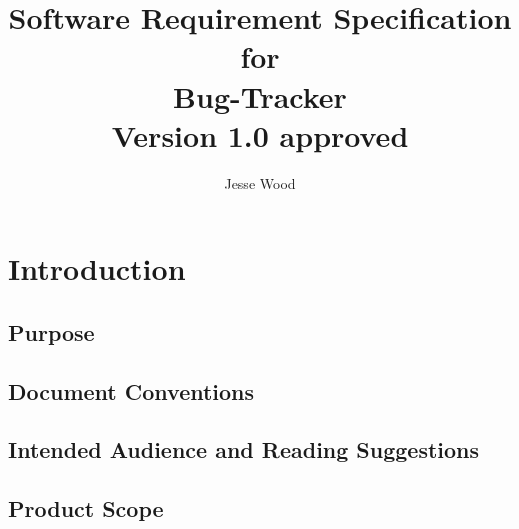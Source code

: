 \documentclass{article}
\newcommand{\comment}[1]{}
\begin{document}
\title{
	Software Requirement Specification \\ 
	for \\ 
	Bug-Tracker \\ 
	Version 1.0 approved
}
\author{Jesse Wood}

\maketitle 

\tableofcontents

\section{Introduction}
\subsection{Purpose}
\comment{
Identify the product whose software requirements are specified in this document, including the revision or release number. Describe the scope of the product that is covered by the SRS. Particularly if this STS describes only part of the system or a single subsytem.
	}
\subsection{Document Conventions}
\comment{
Decribe any standards of typographical conventions that were followed when writing this SRS, such as fonts or highlighting that have special significance. For exmaple, state whether priorites for higher-level requirements are assumed to be inheritied by detailed requirements, or whether every requirement statement is to have its own priorities.
	}
\subsection{Intended Audience and Reading Suggestions}
\comment{
Descibe the different types of reader that the document is inteded for, such as developers, project managers, marketing staff, users, testers, and documentation writers. Describe what the rest of the STS contains and how it is organised. Suggest a sequenc for reading the document, beginning with the overview sections and proceeding throught the sections that are most pertinent to each reader type.
}
\subsection{Product Scope}
\comment{
Provide a short decription of the software being specified and its purpose, including relevant benefits, objectives and goals. Relate the software to corporate goals or business strategies. If a separate vision and scope document is available, refer to it rather than duplicating its contents here.
}
\end{document}
